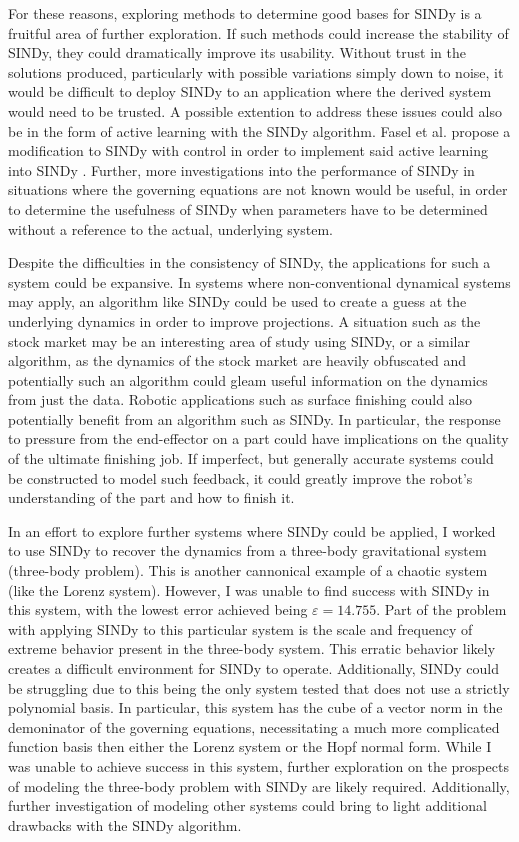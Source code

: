 \documentclass[10pt]{paper}
\begin{document}
For these reasons, exploring methods to determine good bases for SINDy is a fruitful area of further exploration.
If such methods could increase the stability of SINDy, they could dramatically improve its usability. Without trust in the solutions produced, particularly with possible variations simply down to noise, it would be difficult to deploy SINDy to an application where the derived system would need to be trusted. 
A possible extention to address these issues could also be in the form of active learning with the SINDy algorithm. Fasel et al. propose a modification to SINDy with control in order to implement said active learning into SINDy \cite{9683120}. 
Further, more investigations into the performance of SINDy in situations where the governing equations are not known would be useful, in order to determine the usefulness of SINDy when parameters have to be determined without a reference to the actual, underlying system. 

Despite the difficulties in the consistency of SINDy, the applications for such a system could be expansive. In systems where non-conventional dynamical systems may apply, an algorithm like SINDy could be used to create a guess at the underlying dynamics in order to improve projections. 
A situation such as the stock market may be an interesting area of study using SINDy, or a similar algorithm, as the dynamics of the stock market are heavily obfuscated and potentially such an algorithm could gleam useful information on the dynamics from just the data. 
Robotic applications such as surface finishing could also potentially benefit from an algorithm such as SINDy. 
In particular, the response to pressure from the end-effector on a part could have implications on the quality of the ultimate finishing job. 
If imperfect, but generally accurate systems could be constructed to model such feedback, it could greatly improve the robot's understanding of the part and how to finish it. 

In an effort to explore further systems where SINDy could be applied, I worked to use SINDy to recover the dynamics from a three-body gravitational system (three-body problem). This is another cannonical example of a chaotic system (like the Lorenz system). 
However, I was unable to find success with SINDy in this system, with the lowest error achieved being $\varepsilon = 14.755$. Part of the problem with applying SINDy to this particular system is the scale and frequency of extreme behavior present in the three-body system. 
This erratic behavior likely creates a difficult environment for SINDy to operate. Additionally, SINDy could be struggling due to this being the only system tested that does not use a strictly polynomial basis. In particular, this system has the cube of a vector norm in the demoninator of the governing equations, necessitating a much more complicated function basis then either the Lorenz system or the Hopf normal form. 
While I was unable to achieve success in this system, further exploration on the prospects of modeling the three-body problem with SINDy are likely required. Additionally, further investigation of modeling other systems could bring to light additional drawbacks with the SINDy algorithm. 
\end{document}
